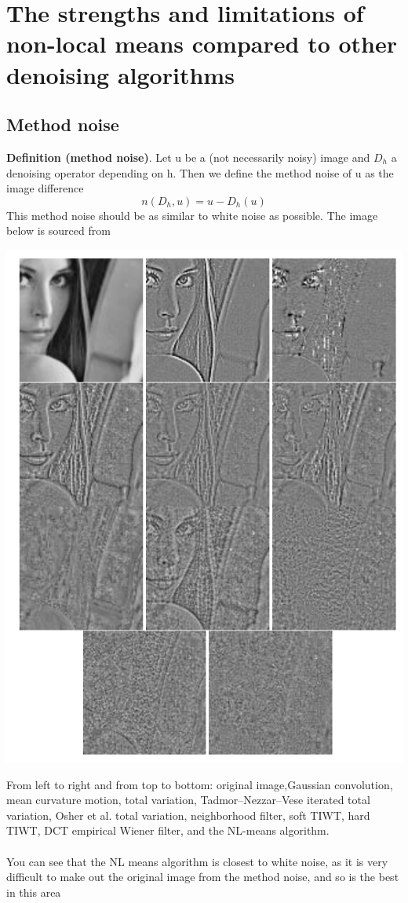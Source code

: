 \documentclass[11pt]{article}
\begin{document}
\section{The strengths and limitations of non-local means compared to other denoising algorithms}
\subsection{Method noise}
\cite{buades_review_2005}\textbf{Definition (method noise)}. Let u be a (not necessarily noisy) image and $D_h$ a denoising operator depending on h. Then we define the method noise of u as the image difference
$$n(D_h,u)=u-D_h(u)$$
This method noise should be as similar to white noise as possible. The image below is sourced from \cite{buades_review_2005}
\begin{center}
	\includegraphics[scale=0.4]{method_noise}
\end{center}
 From left to right and from top to bottom:  original image,Gaussian convolution, mean curvature motion, total variation, Tadmor–Nezzar–Vese iterated total variation, Osher et al. total variation, neighborhood filter, soft TIWT, hard TIWT, DCT empirical Wiener filter, and the NL-means algorithm.\\
 \\
 You can see that the NL means algorithm is closest to white noise, as it is very difficult to make out the original image from the method noise, and so is the best in this area
\end{document}
